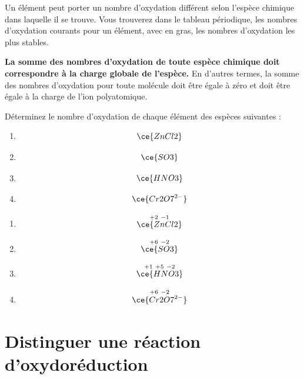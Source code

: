 \documentclass[
  11pt,
  a4paper,
  openany]{book}
\providecommand{\tightlist}{%
  \setlength{\itemsep}{0pt}\setlength{\parskip}{0pt}}
\begin{document}
Un élément peut porter un nombre d'oxydation différent selon l'espèce chimique dans laquelle il se trouve. Vous trouverez dans le tableau périodique, les nombres d'oxydation courants pour un élément, avec en gras, les nombres d'oxydation les plus stables.

\textbf{La somme des nombres d'oxydation de toute espèce chimique doit correspondre à la charge globale de l'espèce.} En d'autres termes, la somme des nombres d'oxydation pour toute molécule doit être égale à zéro et doit être égale à la charge de l'ion polyatomique.

\begin{Exercise}

Déterminez le nombre d'oxydation de chaque élément des espèces suivantes :

\begin{enumerate}
\def\labelenumi{\alph{enumi}.}
\tightlist
\item
  \[
  \ce{ZnCl2}
  \]
\item
  \[
  \ce{SO3}
  \]
\item
  \[
  \ce{HNO3}
  \]
\item
  \[
  \ce{Cr2O7^{2-}}
  \]
\end{enumerate}

\end{Exercise}

\begin{Answer}

\begin{enumerate}
\def\labelenumi{\alph{enumi}.}
\tightlist
\item
  \[
  \overset{+2\ -1}{\ce{ZnCl2}}
  \]
\item
  \[
  \overset{+6\ -2}{\ce{SO3}}
  \]
\item
  \[
  \overset{+1\ +5\ -2}{\ce{HNO3}}
  \]
\item
  \[
  \overset{+6\ -2}{\ce{Cr2O7^{2-}}}
  \]
\end{enumerate}

\end{Answer}

\clearpage

\section{Distinguer une réaction d'oxydoréduction}\label{distinguer-une-ruxe9action-doxydoruxe9duction}
\end{document}

